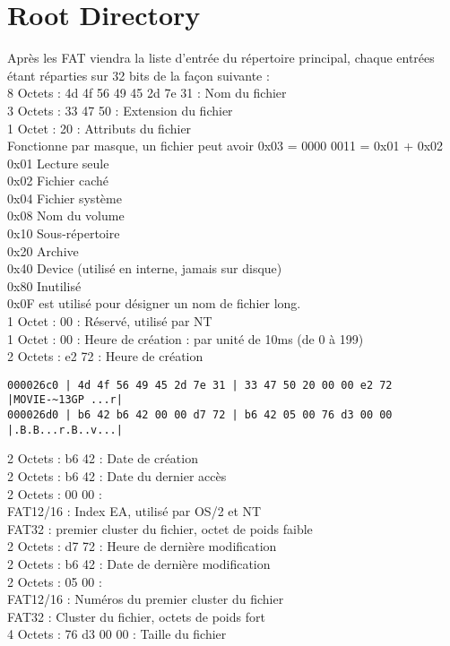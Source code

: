 \documentclass[11pt]{report}
\begin{document}
\section{Root Directory}
Après les FAT viendra la liste d'entrée du répertoire principal, chaque entrées étant réparties sur 32 bits de la façon suivante : \\
8 Octets : 4d 4f 56 49 45 2d 7e 31 : Nom du fichier\\
3 Octets : 33 47 50 : Extension du fichier\\
1 Octet : 20 : Attributs du fichier\\
Fonctionne par masque, un fichier peut avoir 0x03 = 0000 0011 = 0x01 + 0x02\\
0x01	Lecture seule\\
0x02	Fichier caché\\
0x04	Fichier système\\
0x08	Nom du volume\\
0x10	Sous-répertoire\\
0x20	Archive\\
0x40	Device (utilisé en interne, jamais sur disque)\\
0x80	Inutilisé\\
0x0F est utilisé pour désigner un nom de fichier long.\\
1 Octet : 00 : Réservé, utilisé par NT\\
1 Octet : 00 : Heure de création : par unité de 10ms (de 0 à 199)\\
2 Octets : e2 72 : Heure de création
\begin{verbatim}
000026c0 | 4d 4f 56 49 45 2d 7e 31 | 33 47 50 20 00 00 e2 72    |MOVIE-~13GP ...r|
000026d0 | b6 42 b6 42 00 00 d7 72 | b6 42 05 00 76 d3 00 00    |.B.B...r.B..v...|
\end{verbatim} 
2 Octets : b6 42 : Date de création\\
2 Octets : b6 42 : Date du dernier accès\\
2 Octets : 00 00 : \\
FAT12/16 : Index EA, utilisé par OS/2 et NT\\
FAT32 : premier cluster du fichier, octet de poids faible \\
2 Octets : d7 72 : Heure de dernière modification\\
2 Octets : b6 42 : Date de dernière modification \\
2 Octets : 05 00 : \\
FAT12/16 : Numéros du premier cluster du fichier\\
FAT32 : Cluster du fichier, octets de poids fort \\
4 Octets : 76 d3 00 00  : Taille du fichier \\
\newpage
\end{document}
